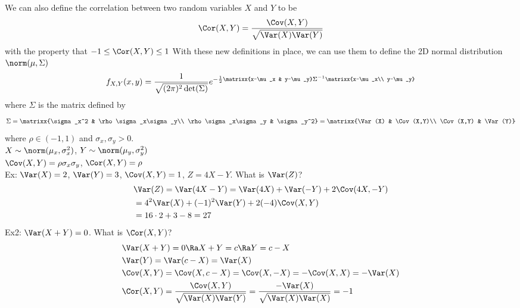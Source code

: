 We can also define the correlation between two random variables $X$ and $Y$ to be
$$\Cor(X,Y)=\frac{\Cov(X,Y)}{\sqrt{\Var(X)\Var(Y)}}$$
with the property that $-1\leq \Cor(X,Y)\leq 1$
With these new definitions in place, we can use them to define the 2D normal distribution $\norm(\mu,\Sigma)$
\[f_{X,Y}(x,y)=\frac{1}{\sqrt{(2\pi)^2\det(\Sigma)}}e^{-\frac{1}{2}\matrixx{x-\mu_x & y-\mu_y}\Sigma^{-1}\matrixx{x-\mu_x\\ y-\mu_y}}\]
where $\Sigma$ is the matrix defined by
\[\Sigma=\matrixx{\sigma_x^2 & \rho\sigma_x\sigma_y\\ \rho\sigma_x\sigma_y & \sigma_y^2}=\matrixx{\Var(X) & \Cov(X,Y)\\ \Cov(X,Y) & \Var(Y)}\]
where $\rho\in(-1,1)$ and $\sigma_x,\sigma_y>0$.\\
$X\sim\norm(\mu_x,\sigma_x^2)$, $Y\sim\norm(\mu_y,\sigma_y^2)$\\
$\Cov(X,Y)=\rho\sigma_x\sigma_y$, $\Cor(X,Y)=\rho$\\
Ex: $\Var(X)=2$, $\Var(Y)=3$, $\Cov(X,Y)=1$, $Z=4X-Y$. What is $\Var(Z)$?
\begin{align*}
    &\Var(Z)=\Var(4X-Y)=\Var(4X)+\Var(-Y)+2\Cov(4X,-Y)\\
    &=4^2\Var(X)+(-1)^2\Var(Y)+2(-4)\Cov(X,Y)\\
    &=16\cdot 2+3-8=27
\end{align*}
Ex2: $\Var(X+Y)=0$. What is $\Cor(X,Y)$?
\begin{align*}
    &\Var(X+Y)=0\Ra X+Y=c\Ra Y=c-X\\
    &\Var(Y)=\Var(c-X)=\Var(X)\\
    &\Cov(X,Y)=\Cov(X,c-X)=\Cov(X,-X)=-\Cov(X,X)=-\Var(X)\\
    &\Cor(X,Y)=\frac{\Cov(X,Y)}{\sqrt{\Var(X)\Var(Y)}}=\frac{-\Var(X)}{\sqrt{\Var(X)\Var(X)}}=-1
\end{align*}
